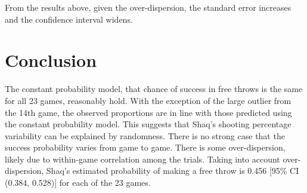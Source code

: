\documentclass[12pt, letterpaper]{article}
\begin{document}
From the results above, given the over-dispersion, the standard error increases and the confidence interval widens.  

\section{Conclusion}
The constant probability model, that chance of success in free throws is the same for all 23 games, reasonably hold.  With the exception of the large outlier from the 14th game, the observed proportions are in line with those predicted using the constant probability model.  This suggests that Shaq's shooting percentage variability can be explained by randomness.  There is no strong case that the success probability varies from game to game.  There is some over-dispersion, likely due to within-game correlation among the trials.  Taking into account over-dispersion, Shaq's estimated probability of making a free throw is 0.456 [95\% CI (0.384, 0.528)] for each of the 23 games.  
\end{document}
